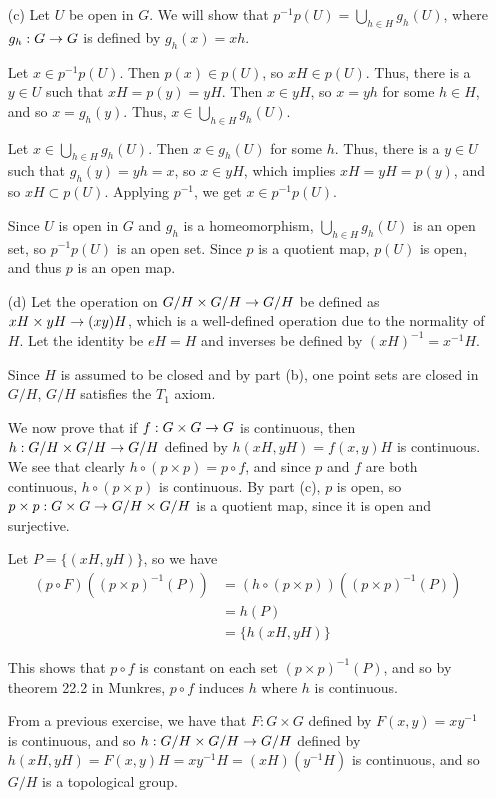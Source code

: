 \documentclass{hmwk}
\begin{document}
\begin{solution}
\begin{itemize}
\item[(c)] Let $U$ be open in $G$. We will show that $p^{-1}p(U) = \bigcup_{h \in H}g_h(U)$, where $g_h: G \rightarrow G$ is defined by $g_h(x) = xh$.

\pre Let $x \in p^{-1}p(U)$. Then $p(x) \in p(U)$, so $xH \in p(U)$. Thus, there is a $y \in U$ such that $xH = p(y) = yH$. Then $x \in yH$, so $x = yh$ for some $h\in H$, and so $x = g_h(y)$. Thus, $x \in \bigcup_{h \in H}g_h(U)$. 

\pre Let $x \in \bigcup_{h \in H}g_h(U)$. Then $x \in g_h(U)$ for some $h$. Thus, there is a $y \in U$ such that $g_h(y) = yh = x$, so $x \in yH$, which implies $xH = yH = p(y)$, and so $xH \subset p(U)$. Applying $p^{-1}$, we get $x \in p^{-1}p(U)$.

\pre Since $U$ is open in $G$ and $g_h$ is a homeomorphism, $\bigcup_{h \in H}g_h(U)$ is an open set, so $p^{-1}p(U)$ is an open set. Since $p$ is a quotient map, $p(U)$ is open, and thus $p$ is an open map.

\item[(d)] Let the operation on $G/H \times G/H \rightarrow G/H$ be defined as $xH \times yH \rightarrow (xy)H$, which is a well-defined operation due to the normality of $H$. Let the identity be $eH = H$ and inverses be defined by $(xH)^{-1} = x^{-1}H$.

\pre Since $H$ is assumed to be closed and by part (b), one point sets are closed in $G/H$, $G/H$ satisfies the $T_1$ axiom.

\pre We now prove that if $f: G \times G \rightarrow G$ is continuous, then $h: G/H \times G/H \rightarrow G/H$ defined by $h(xH, yH) = f(x, y)H$ is continuous. We see that clearly $h \circ (p \times p) = p \circ f$, and since $p$ and $f$ are both continuous, $h \circ (p \times p)$ is continuous. By part (c), $p$ is open, so $p \times p: G \times G \rightarrow G/H \times G/H$ is a quotient map, since it is open and surjective. 

\pre Let $P = \{(xH, yH)\}$, so we have 
\begin{align*}
    (p \circ F)((p \times p)^{-1}(P)) &= (h \circ (p \times p))((p \times p)^{-1}(P)) \\
    &= h(P) \\
    &= \{h(xH, yH)\}
\end{align*}

This shows that $p \circ f$ is constant on each set $(p \times p)^{-1}(P)$, and so by theorem 22.2 in Munkres, $p \circ f$ induces $h$ where $h$ is continuous. 

From a previous exercise, we have that $F: G \times G$ defined by $F(x, y) = xy^{-1}$ is continuous, and so $h: G/H \times G/H \rightarrow G/H$ defined by $h(xH, yH) = F(x, y)H = xy^{-1}H = (xH)(y^{-1}H)$ is continuous, and so $G/H$ is a topological group.
\end{itemize}
\end{solution}
\end{document}

